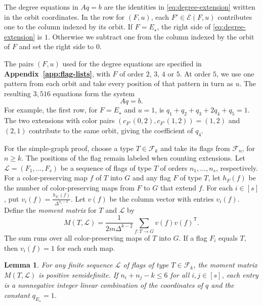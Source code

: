 \documentclass[preprint,11pt,numbers]{elsarticle-arxiv}
\numberwithin{equation}{section}
\newtheorem{lemma}[theorem]{Lemma}
\theoremstyle{definition}
\begin{document}
The degree equations in $Aq=b$ are the identities in
\eqref{eq:degree-extension} written in the orbit coordinates.
In the row for $(F,u)$, each $F'\in\mathcal E(F,u)$ contributes
one to the column indexed by its orbit. If $F=E_\star$, the right
side of \eqref{eq:degree-extension} is $1$. Otherwise we subtract
one from the column indexed by the orbit of $F$ and set the right
side to $0$.

The pairs $(F,u)$ used for the degree equations are specified
in \textbf{Appendix~\ref{app:flag-lists}}, with $F$ of order $2$, $3$,
$4$ or $5$. At order $5$, we use one pattern from each orbit and
take every position of that pattern in turn as $u$. The resulting
$3{,}516$ equations form the system
\begin{equation}\label{eq:linear-system}
 Aq=b.
\end{equation}
For example, the first row, for $F=E_\star$ and $u=1$, is
$q_1+q_2+q_3+2q_4+q_5=1$. The two extensions with color pairs
$(c_{F'}(0,2),c_{F'}(1,2))=(1,2)$ and $(2,1)$ contribute to
the same orbit, giving the coefficient of $q_4$.

For the simple-graph proof, choose a type $T\in\mathcal F_k$ and
take its flags from $\mathcal F_n$, for $n\geq k$. The positions
of the flag remain labeled when counting extensions. Let
$\mathcal L=(F_1,\ldots,F_s)$ be a sequence of flags of type $T$ of
orders $n_1,\ldots,n_s$, respectively. For a color-preserving map
$f$ of $T$ into $G$ and any flag $F$ of type $T$, let $h_F(f)$ be
the number of color-preserving maps from $F$ to $G$ that extend
$f$. For each $i\in[s]$, put $v_i(f)=\frac{h_{F_i}(f)}{\Delta^{n_i-k}}$.
Let $v(f)$ be the column vector with entries $v_i(f)$. Define the
\emph{moment matrix} for $T$ and $\mathcal L$ by
\begin{equation}\label{eq:moment-definition}
 M(T,\mathcal L)=\frac{1}{2m\Delta^{k-2}}
       \sum_{f:T\to G}v(f)v(f)^{\mathsf T}.
\end{equation}
The sum runs over all color-preserving maps of $T$ into $G$. If a
flag $F_i$ equals $T$, then $v_i(f)=1$ for each such map.

\begin{lemma}\label{lem:moment}
For any finite sequence $\mathcal L$ of flags of type $T\in\mathcal F_k$,
the moment matrix $M(T,\mathcal L)$ is positive semidefinite.
If $n_i+n_j-k\leq6$ for all $i,j\in[s]$, each entry is a nonnegative
integer linear combination of the coordinates of $q$ and the
constant $q_{E_\star}=1$.
\end{lemma}
\end{document}
